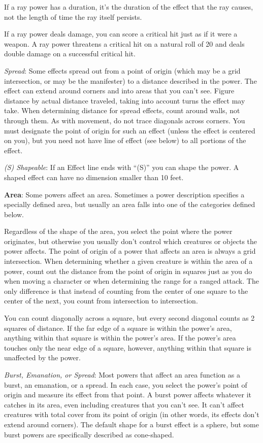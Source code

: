 If a ray power has a duration, it's the duration of the effect that the ray causes, not the length of time the ray itself persists.

If a ray power deals damage, you can score a critical hit just as if it were a weapon. A ray power threatens a critical hit on a natural roll of 20 and deals double damage on a successful critical hit.

\textit{Spread}: Some effects spread out from a point of origin (which may be a grid intersection, or may be the manifester) to a distance described in the power. The effect can extend around corners and into areas that you can't see. Figure distance by actual distance traveled, taking into account turns the effect may take. When determining distance for spread effects, count around walls, not through them. As with movement, do not trace diagonals across corners. You must designate the point of origin for such an effect (unless the effect is centered on you), but you need not have line of effect (see below) to all portions of the effect.

\textit{(S) Shapeable}: If an Effect line ends with ``(S)'' you can shape the power. A shaped effect can have no dimension smaller than 10 feet.

\textbf{Area}: Some powers affect an area. Sometimes a power description specifies a specially defined area, but usually an area falls into one of the categories defined below.

Regardless of the shape of the area, you select the point where the power originates, but otherwise you usually don't control which creatures or objects the power affects. The point of origin of a power that affects an area is always a grid intersection. When determining whether a given creature is within the area of a power, count out the distance from the point of origin in squares just as you do when moving a character or when determining the range for a ranged attack. The only difference is that instead of counting from the center of one square to the center of the next, you count from intersection to intersection.

You can count diagonally across a square, but every second diagonal counts as 2 squares of distance. If the far edge of a square is within the power's area, anything within that square is within the power's area. If the power's area touches only the near edge of a square, however, anything within that square is unaffected by the power.

\textit{Burst, Emanation, or Spread}: Most powers that affect an area function as a burst, an emanation, or a spread. In each case, you select the power's point of origin and measure its effect from that point. A burst power affects whatever it catches in its area, even including creatures that you can't see. It can't affect creatures with total cover from its point of origin (in other words, its effects don't extend around corners). The default shape for a burst effect is a sphere, but some burst powers are specifically described as cone-shaped.

